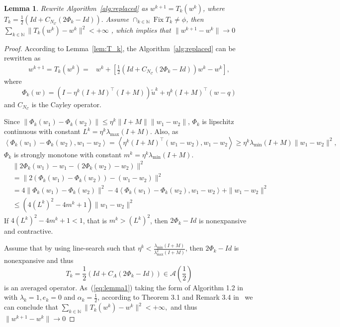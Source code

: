 \documentclass[10pt]{article} %
\newtheorem{lemma}[thm]{Lemma}
\begin{document}
\begin{lemma}
\label{lem:conv_repl}
Rewrite Algorithm~\ref{alg:replaced} as $w^{k+1} = T_k(w^k)$, where 
$
T_k = \frac{1}{2}\left(Id + C_{N_\mathcal{C}}(2\Phi_k-Id)\right).
$
Assume $ \cap_{k\in \mathbb{N}} \operatorname{Fix} T_k \not = \phi$, then 
$
\sum_{k\in \mathbb{N}} \|T_k(w^k) - w^k\|^2 < +\infty
$
, which implies that 
$
\|w^{k+1} -w^k\| \to 0
$
\end{lemma}

\begin{proof}
According to Lemma~\ref{lem:T_k}, the Algorithm~\ref{alg:replaced} can be rewritten as 
\begin{equation}
\label{eq:lemma1}
\begin{aligned}
w^{k+1} = T_k(w^k) = & w^k + \left[\frac{1}{2}(Id + C_{N_\mathcal{C}}(2\Phi_k -Id))w^k - w^k\right],
\end{aligned}
\end{equation}
where 
$$
\Phi_k(w) = \left(I - \eta^k (I+M)^\top (I+M)\right)\tilde{u}^k + \eta^k (I+M)^\top (w-q)
$$ and $C_{N_\mathcal{C}}$ is the Cayley operator.

Since
$
\|\Phi_k(w_1) - \Phi_k(w_2)\| \leq \eta^k \|I+M\|\|w_1-w_2\|
$,
$\Phi_k$ is lipschitz continuous with constant $L^k=\eta^k\lambda_{\max}(I+M)$.
Also, as
$$
    \left<\Phi_k(w_1) - \Phi_k(w_2), w_1-w_2\right> = \left<\eta^k (I+M)^\top (w_1-w_2), w_1-w_2\right> \geq \eta^k\lambda_{\min}(I+M) \|w_1-w_2\|^2,
$$
$\Phi_k$ is strongly monotone with constant $m^k=\eta^k\lambda_{\min}(I+M)$.
\begin{equation*}
\begin{aligned}
    &\|2\Phi_k(w_1) - w_1 - (2\Phi_k(w_2)-w_2)\|^2 \\
    & = \|2(\Phi_k(w_1)-\Phi_k(w_2)) - (w_1-w_2)\|^2 \\
    & = 4\|\Phi_k(w_1)-\Phi_k(w_2)\|^2 - 4\left<\Phi_k(w_1) - \Phi_k(w_2), w_1-w_2\right> + \|w_1-w_2\|^2 \\
    &\leq (4(L^k)^2-4m^k+1) \|w_1-w_2\|^2
\end{aligned}
\end{equation*}
If $4(L^k)^2 - 4m^k + 1 < 1$, that is $m^k > (L^k)^2$, then $2\Phi_k - Id$ is nonexpansive and contractive.

Assume that by using line-search such that $
\eta^k < \frac{\lambda_{\min}(I+M)}{\lambda^2_{\max}(I+M)}
$, then $2\Phi_k-Id$ is nonexpansive and thus 
$$
T_k = \frac{1}{2}(Id + C_A(2\Phi_k -Id))\in \mathcal{A}(\frac{1}{2})
$$ is an averaged operator.
As~(\ref{eq:lemma1}) taking the form of Algorithm 1.2 in~\citet{combettes2004solving} with $\lambda_k = 1, e_k = 0$ and $\alpha_k = \frac{1}{2}$, according to Theorem 3.1 and Remark 3.4 in~\citet{combettes2004solving} we can conclude that
$
\sum_{k\in \mathbb{N}} \|T_k(w^k) - w^k\|^2 < +\infty, 
$
and thus
$
\|w^{k+1} -w^k\| \to 0
$
\end{proof}
\end{document}
